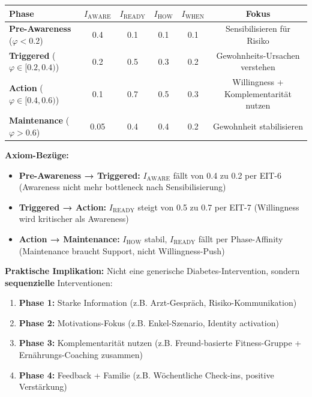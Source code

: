 \begin{center}
\small
\renewcommand{\arraystretch}{1.3}
\begin{tabular}{@{}lccccc@{}}
\toprule
\textbf{Phase} & $I_{\text{AWARE}}$ & $I_{\text{READY}}$ & $I_{\text{HOW}}$ & $I_{\text{WHEN}}$ & \textbf{Fokus} \\
\midrule
\textbf{Pre-Awareness} ($\varphi < 0.2$) & 0.4 & 0.1 & 0.1 & 0.1 & Sensibilisieren für Risiko \\
\textbf{Triggered} ($\varphi \in [0.2, 0.4)$) & 0.2 & 0.5 & 0.3 & 0.2 & Gewohnheits-Ursachen verstehen \\
\textbf{Action} ($\varphi \in [0.4, 0.6)$) & 0.1 & 0.7 & 0.5 & 0.3 & Willingness + Komplementarität nutzen \\
\textbf{Maintenance} ($\varphi > 0.6$) & 0.05 & 0.4 & 0.4 & 0.2 & Gewohnheit stabilisieren \\
\bottomrule
\end{tabular}
\end{center}

\textbf{Axiom-Bezüge:}
\begin{itemize}[nosep]
\item \textbf{Pre-Awareness → Triggered:} $I_{\text{AWARE}}$ fällt von 0.4 zu 0.2 per EIT-6 (Awareness nicht mehr bottleneck nach Sensibilisierung)
\item \textbf{Triggered → Action:} $I_{\text{READY}}$ steigt von 0.5 zu 0.7 per EIT-7 (Willingness wird kritischer als Awareness)
\item \textbf{Action → Maintenance:} $I_{\text{HOW}}$ stabil, $I_{\text{READY}}$ fällt per Phase-Affinity (Maintenance braucht Support, nicht Willingness-Push)
\end{itemize}

\textbf{Praktische Implikation:} Nicht eine generische Diabetes-Intervention, sondern \textbf{sequenzielle} Interventionen:
\begin{enumerate}[nosep]
\item \textbf{Phase 1:} Starke Information (z.B. Arzt-Gespräch, Risiko-Kommunikation)
\item \textbf{Phase 2:} Motivations-Fokus (z.B. Enkel-Szenario, Identity activation)
\item \textbf{Phase 3:} Komplementarität nutzen (z.B. Freund-basierte Fitness-Gruppe + Ernährungs-Coaching zusammen)
\item \textbf{Phase 4:} Feedback + Familie (z.B. Wöchentliche Check-ins, positive Verstärkung)
\end{enumerate}

